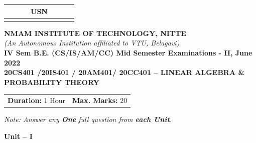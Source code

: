 \documentclass[11pt,a4paper]{article}
\begin{document}
\begin{center}
\begin{tabular}{|c|c|c|c|c|c|c|c|c|c|}
\hline
\multicolumn{10}{|c|}{USN} \\
\hline
& & & & & & & & & \\
\hline
\end{tabular}

\vspace{0.4cm}

{\Large \textbf{NMAM INSTITUTE OF TECHNOLOGY, NITTE}}\\[0.2cm]
{\small \textit{(An Autonomous Institution affiliated to VTU, Belagavi)}}\\[0.2cm]
{\large \textbf{IV Sem B.E. (CS/IS/AM/CC) Mid Semester Examinations - II, June 2022}}\\[0.2cm]
{\large \textbf{20CS401 /20IS401 / 20AM401/ 20CC401 -- LINEAR ALGEBRA \& PROBABILITY THEORY}}\\[0.2cm]
\end{center}

\noindent
\begin{tabular}{p{8cm}r}
\textbf{Duration:} 1 Hour & \textbf{Max. Marks:} 20
\end{tabular}

\vspace{0.2cm}
\begin{center}
\textit{Note: Answer any \textbf{One} full question from \textbf{each Unit}.}
\end{center}

\vspace{0.2cm}

\begin{center}
{\large \textbf{Unit -- I}}
\end{center}
\end{document}

